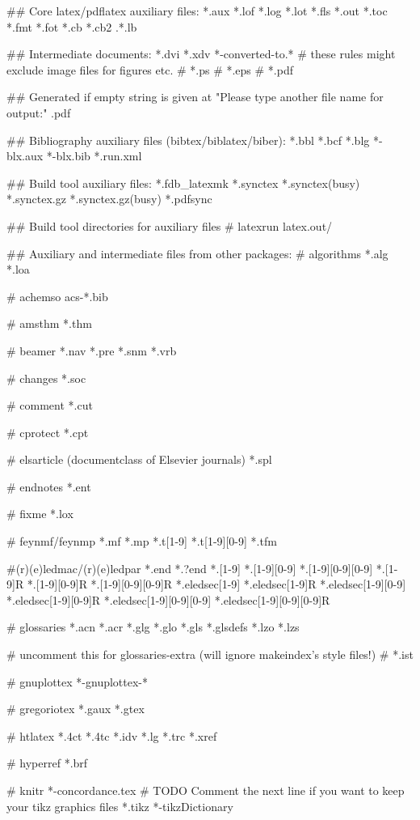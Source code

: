 ## Core latex/pdflatex auxiliary files:
*.aux
*.lof
*.log
*.lot
*.fls
*.out
*.toc
*.fmt
*.fot
*.cb
*.cb2
.*.lb

## Intermediate documents:
*.dvi
*.xdv
*-converted-to.*
# these rules might exclude image files for figures etc.
# *.ps
# *.eps
# *.pdf

## Generated if empty string is given at "Please type another file name for output:"
.pdf

## Bibliography auxiliary files (bibtex/biblatex/biber):
*.bbl
*.bcf
*.blg
*-blx.aux
*-blx.bib
*.run.xml

## Build tool auxiliary files:
*.fdb_latexmk
*.synctex
*.synctex(busy)
*.synctex.gz
*.synctex.gz(busy)
*.pdfsync

## Build tool directories for auxiliary files
# latexrun
latex.out/

## Auxiliary and intermediate files from other packages:
# algorithms
*.alg
*.loa

# achemso
acs-*.bib

# amsthm
*.thm

# beamer
*.nav
*.pre
*.snm
*.vrb

# changes
*.soc

# comment
*.cut

# cprotect
*.cpt

# elsarticle (documentclass of Elsevier journals)
*.spl

# endnotes
*.ent

# fixme
*.lox

# feynmf/feynmp
*.mf
*.mp
*.t[1-9]
*.t[1-9][0-9]
*.tfm

#(r)(e)ledmac/(r)(e)ledpar
*.end
*.?end
*.[1-9]
*.[1-9][0-9]
*.[1-9][0-9][0-9]
*.[1-9]R
*.[1-9][0-9]R
*.[1-9][0-9][0-9]R
*.eledsec[1-9]
*.eledsec[1-9]R
*.eledsec[1-9][0-9]
*.eledsec[1-9][0-9]R
*.eledsec[1-9][0-9][0-9]
*.eledsec[1-9][0-9][0-9]R

# glossaries
*.acn
*.acr
*.glg
*.glo
*.gls
*.glsdefs
*.lzo
*.lzs

# uncomment this for glossaries-extra (will ignore makeindex's style files!)
# *.ist

# gnuplottex
*-gnuplottex-*

# gregoriotex
*.gaux
*.gtex

# htlatex
*.4ct
*.4tc
*.idv
*.lg
*.trc
*.xref

# hyperref
*.brf

# knitr
*-concordance.tex
# TODO Comment the next line if you want to keep your tikz graphics files
*.tikz
*-tikzDictionary

